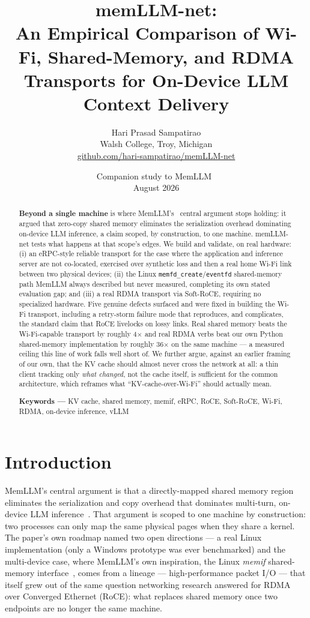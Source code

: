 \documentclass[11pt]{article}
\title{\textbf{memLLM-net:}\\[4pt]
\large An Empirical Comparison of Wi-Fi, Shared-Memory, and RDMA\\
Transports for On-Device LLM Context Delivery}
\author{Hari Prasad Sampatirao \\ \small Walsh College, Troy, Michigan \\ \small \href{https://github.com/hari-sampatirao/memLLM-net}{github.com/hari-sampatirao/memLLM-net}}
\date{Companion study to MemLLM~\cite{memllm} \\ August 2026}
\begin{document}
\maketitle

\begin{abstract}
\noindent
\textbf{Beyond a single machine} is where MemLLM's~\cite{memllm} central argument stops holding: it argued that zero-copy shared memory eliminates the serialization overhead dominating on-device LLM inference, a claim scoped, by construction, to one machine. memLLM-net tests what happens at that scope's edges. We build and validate, on real hardware: (i) an eRPC-style reliable transport for the case where the application and inference server are not co-located, exercised over synthetic loss and then a real home Wi-Fi link between two physical devices; (ii) the Linux \texttt{memfd\_create}/\texttt{eventfd} shared-memory path MemLLM always described but never measured, completing its own stated evaluation gap; and (iii) a real RDMA transport via Soft-RoCE, requiring no specialized hardware. Five genuine defects surfaced and were fixed in building the Wi-Fi transport, including a retry-storm failure mode that reproduces, and complicates, the standard claim that RoCE livelocks on lossy links. Real shared memory beats the Wi-Fi-capable transport by roughly 4$\times$ and real RDMA verbs beat our own Python shared-memory implementation by roughly 36$\times$ on the same machine --- a measured ceiling this line of work falls well short of. We further argue, against an earlier framing of our own, that the KV cache should almost never cross the network at all: a thin client tracking only \emph{what changed}, not the cache itself, is sufficient for the common architecture, which reframes what ``KV-cache-over-Wi-Fi'' should actually mean.

\medskip
\noindent\textbf{Keywords ---} KV cache, shared memory, memif, eRPC, RoCE, Soft-RoCE, Wi-Fi, RDMA, on-device inference, vLLM
\end{abstract}

\section{Introduction}

MemLLM's central argument is that a directly-mapped shared memory region eliminates the serialization and copy overhead that dominates multi-turn, on-device LLM inference~\cite{memllm}. That argument is scoped to one machine by construction: two processes can only map the same physical pages when they share a kernel. The paper's own roadmap named two open directions --- a real Linux implementation (only a Windows prototype was ever benchmarked) and the multi-device case, where MemLLM's own inspiration, the Linux \emph{memif} shared-memory interface~\cite{memif}, comes from a lineage --- high-performance packet I/O --- that itself grew out of the same question networking research answered for RDMA over Converged Ethernet (RoCE): what replaces shared memory once two endpoints are no longer the same machine.
\end{document}
